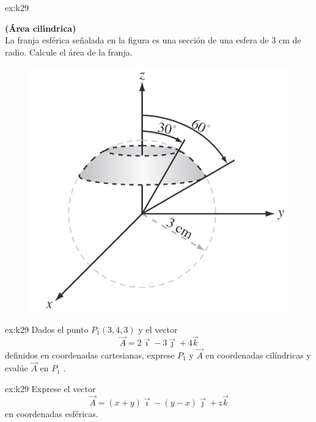     \begin{excercise}[][][$S=20.7\, \rm{cm^2}$]{ex:k29}{ \textbf{(Área cilindrica)}\\
            La franja esférica señalada en la figura es una sección de una esfera de $3$ cm de radio. Calcule el área de la franja.           
            \begin{figure}[H]
                \centering
                \includegraphics[width=0.8\linewidth]{img/01_electric-field/3.png}
            \end{figure}
        }
    \end{excercise}

    \begin{excercise}[][][$P_1=P_1(5, 306.9^\circ, 3)$; $\vec{A}=3.6\vec{e}_r-0.2\vec{e}_\phi+4\vec{k}$]{ex:k29}{ 
            Dados el punto $P_1 (3, 4, 3)$ y el vector
            \begin{equation*}
                \vec{A}=2\vec{\imath}-3\vec{\jmath} +4\vec{k}
            \end{equation*}
            definidos en coordenadas cartesianas, exprese $P_1$ y $\vec{A}$ en coordenadas cilíndricas y evalúe $\vec{A}$ en $P_1$ .
        }
    \end{excercise}

    \begin{excercise}[][][$\vec{A}=R\vec{e}_R-R\sin{\phi}\vec{e}_\theta$]{ex:k29}{ 
            Exprese el vector 
            \begin{equation*}
                \vec{A}=(x+y)\vec{\imath}-(y-x)\vec{\jmath} +z\vec{k}
            \end{equation*}
            en coordenadas esféricas.
        }
    \end{excercise}

